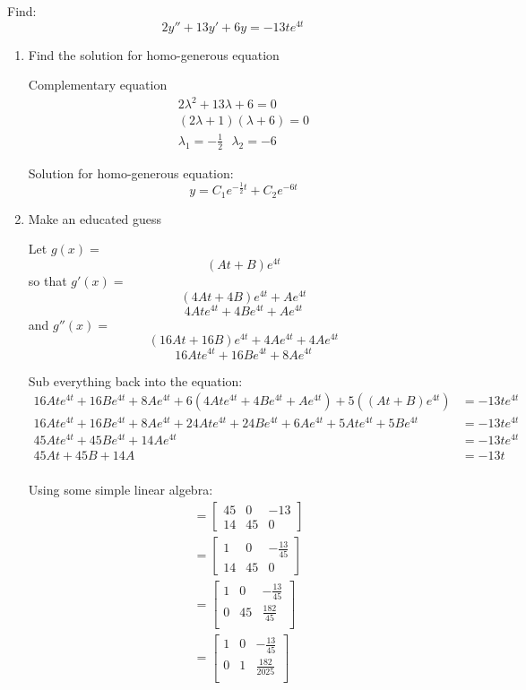 	\begin{example}{}{}
	Find:
	$$2y''+13y'+6y=-13te^{4t}$$
	
	\begin{enumerate}
	\item Find the solution for homo-generous equation
	
	\indent Complementary equation
	\begin{align*}
	2\lambda^2+13\lambda +6=0\\
	(2\lambda+1)(\lambda+6)=0\\
	\lambda_1=-\frac{1}{2}\ \ \ \lambda_2=-6
	\end{align*}
	
	Solution for homo-generous equation:
	$$y=C_1e^{-\frac{1}{2}t}+C_2e^{-6t}$$
	
	\item Make an educated guess
	
	Let $g(x)=$
	$$(At+B)e^{4t}$$
	so that $g'(x)=$
	$$(4At+4B)e^{4t}+Ae^{4t}$$
	$$4Ate^{4t}+4Be^{4t}+Ae^{4t}$$
	and $g''(x)=$
	$$(16At+16B)e^{4t}+4Ae^{4t}+4Ae^{4t}$$
	$$16Ate^{4t}+16Be^{4t}+8Ae^{4t}$$
	
	Sub everything back into the equation:
	\begin{align*}
	16Ate^{4t}+16Be^{4t}+8Ae^{4t}+6(4Ate^{4t}+4Be^{4t}+Ae^{4t})+5((At+B)e^{4t})&=-13te^{4t}\\
	16Ate^{4t}+16Be^{4t}+8Ae^{4t}+24Ate^{4t}+24Be^{4t}+6Ae^{4t}+5Ate^{4t}+5Be^{4t}&=-13te^{4t}\\
	45Ate^{4t}+45Be^{4t}+14Ae^{4t}&=-13te^{4t}\\
	45At+45B+14A&=-13t\\
	\end{align*}
	
	Using some simple linear algebra:
	\begin{align*}
	&=\left[\begin{array}{cc|c}
	45 & 0 & -13\\
	14&45&0
	\end{array}\right]\\
	&=\left[\begin{array}{cc|c}
	1&0&-\frac{13}{45}\\
	14&45&0
	\end{array}\right]\\
	&=\left[\begin{array}{cc|c}
	1&0&-\frac{13}{45}\\
	0&45&\frac{182}{45}\\
	\end{array}\right]\\
	&=\left[\begin{array}{cc|c}
	1&0&-\frac{13}{45}\\
	0&1&\frac{182}{2025}\\
	\end{array}\right]
	\end{align*}
	

\end{enumerate}
\end{example}
